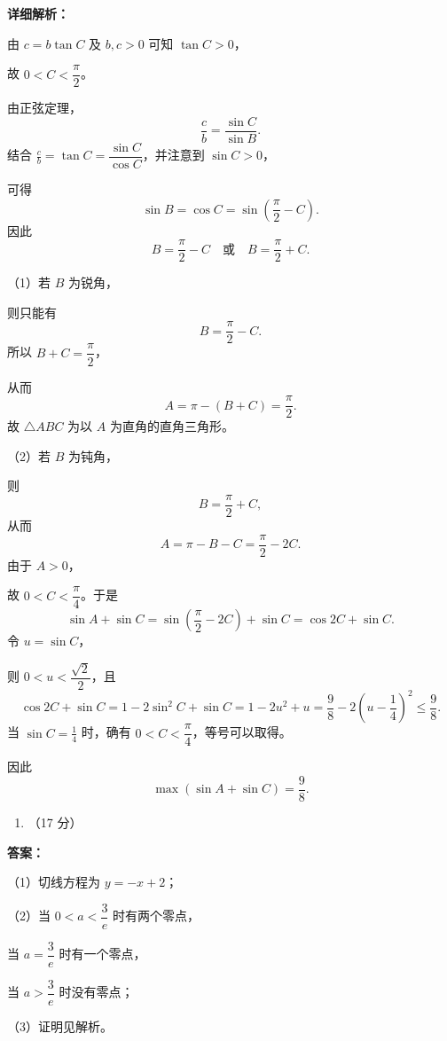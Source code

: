 \documentclass[UTF8,12pt,a4paper]{ctexart}
\renewcommand{\labelenumi}{\arabic{enumi}.}
\providecommand{\tightlist}{%
  \setlength{\itemsep}{0pt}\setlength{\parskip}{0pt}}
\begin{document}
\textbf{详细解析：}

由 \(c=b\tan C\) 及 \(b,c>0\) 可知 \(\tan C>0\)，

故 \(0<C<\dfrac{\pi}{2}\)。

由正弦定理，
\[
   \frac cb=\dfrac{\sin C}{\sin B}.
   \]
结合 \(\frac cb=\tan C=\dfrac{\sin C}{\cos C}\)，并注意到 \(\sin C>0\)，

可得
\[
   \sin B=\cos C=\sin\left(\dfrac{\pi}{2}-C\right).
   \]
因此
\[
   B=\dfrac{\pi}{2}-C
   \quad\text{或}\quad
   B=\dfrac{\pi}{2}+C.
   \]


\par\smallskip\noindent（1）若 \(B\) 为锐角，

则只能有
\[
   B=\dfrac{\pi}{2}-C.
   \]
所以 \(B+C=\dfrac{\pi}{2}\)，

从而
\[
   A=\pi-(B+C)=\dfrac{\pi}{2}.
   \]
故 \(\triangle ABC\) 为以 \(A\) 为直角的直角三角形。


\par\smallskip\noindent（2）若 \(B\) 为钝角，

则
\[
   B=\dfrac{\pi}{2}+C,
   \]
从而
\[
   A=\pi-B-C=\dfrac{\pi}{2}-2C.
   \]
由于 \(A>0\)，

故 \(0<C<\dfrac{\pi}{4}\)。于是
\[
   \sin A+\sin C
   =\sin\left(\dfrac{\pi}{2}-2C\right)+\sin C
   =\cos 2C+\sin C.
   \]
令 \(u=\sin C\)，

则 \(0<u<\dfrac{\sqrt2}{2}\)，且
\[
   \cos 2C+\sin C
   =1-2\sin^2C+\sin C
   =1-2u^2+u
   =\frac98-2\left(u-\frac14\right)^2
   \leqslant \frac98.
   \]
当 \(\sin C=\frac14\) 时，确有 \(0<C<\dfrac{\pi}{4}\)，等号可以取得。

因此
\[
   \boxed{\max(\sin A+\sin C)=\frac98}.
   \]

\begin{enumerate}
\def\labelenumi{\arabic{enumi}.}
\setcounter{enumi}{17}
\tightlist
\item
  （17 分）
\end{enumerate}

\textbf{答案：}
\par\smallskip\noindent（1）切线方程为 \(y=-x+2\)；


\par\smallskip\noindent（2）当 \(0<a<\dfrac3e\) 时有两个零点，

当 \(a=\dfrac3e\) 时有一个零点，

当 \(a>\dfrac3e\) 时没有零点；


\par\smallskip\noindent（3）证明见解析。
\end{document}
